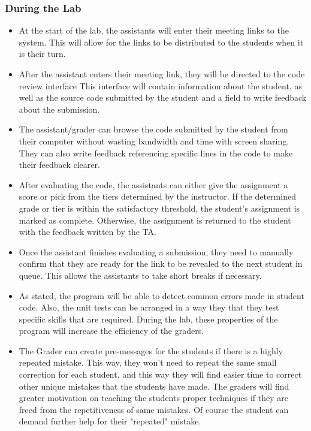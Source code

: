 \documentclass[a4paper, 12pt]{article}
\begin{document}
    
    \subsubsection{During the Lab}
    
    \begin{itemize}
        \item At the start of the lab, the assistants will enter their meeting links to the system.
        This will allow for the links to be distributed to the students when it is their turn.
        \item After the assistant enters their meeting link, they will be directed to the code review interface
        This interface will contain information about the student, as well as the source code submitted by the student
        and a field to write feedback about the submission.
        \item The assistant/grader can browse the code submitted by the student from their computer without wasting bandwidth
        and time with screen sharing. They can also write feedback referencing specific lines in the code to make their
        feedback clearer.
        \item After evaluating the code, the assistants can either give the assignment a score or pick
          from the tiers determined by the instructor. If the determined grade or tier is within the satisfactory
          threshold, the student's assignment is marked as complete. Otherwise, the assignment is returned to the
          student with the feedback written by the TA.
        \item Once the assistant finishes evaluating a submission, they need to manually confirm that they are
          ready for the link to be revealed to the next student in queue. This allows the assistants to take short
          breaks if necessary.
        \item As stated, the program will be able to detect common errors made in student code. 
        Also, the unit tests can be arranged in a way they that they test specific skills that are
        required. During the lab, these properties of the program will increase the efficiency of the
        graders.
        \item The Grader can create pre-messages for the students if there is a highly repeated
        mistake. This way, they won't need to repeat the same small correction for each student,
        and this way they will find easier time to correct other unique mistakes that the students
        have made. The graders will find greater motivation on teaching the students proper techniques
        if they are freed from the repetitiveness of same mistakes. Of course the student can demand
        further help for their "repeated" mistake.
    \end{itemize}
    
\end{document}
